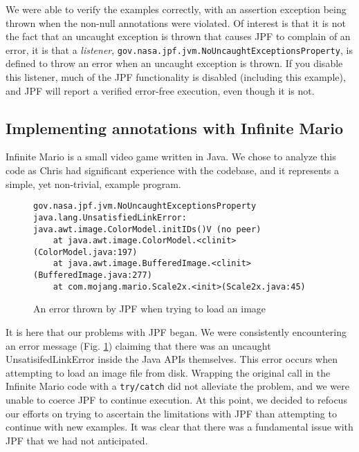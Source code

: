 \documentclass[twocolumn]{article}
\begin{document}
We were able to verify the examples correctly, with an assertion exception being thrown when the non-null annotations were violated. Of interest is that it is not the fact that an uncaught exception is thrown that causes JPF to complain of an error, it is that a \emph{listener}, \texttt{gov.nasa.jpf.jvm.NoUncaughtExceptionsProperty}, is defined to throw an error when an uncaught exception is thrown. If you disable this listener, much of the JPF functionality is disabled (including this example), and JPF will report a verified error-free execution, even though it is not.

\subsection{Implementing annotations with Infinite Mario}
Infinite Mario \cite{infinitemario} is a small video game written in Java. We chose to analyze this code as Chris had significant experience with the codebase, and it represents a simple, yet non-trivial, example program.

\begin{figure}[tb]
    \lstset{language=,breaklines=true}
    \begin{lstlisting}
gov.nasa.jpf.jvm.NoUncaughtExceptionsProperty
java.lang.UnsatisfiedLinkError: java.awt.image.ColorModel.initIDs()V (no peer)
    at java.awt.image.ColorModel.<clinit>(ColorModel.java:197)
	at java.awt.image.BufferedImage.<clinit>(BufferedImage.java:277)
    at com.mojang.mario.Scale2x.<init>(Scale2x.java:45)
\end{lstlisting}
	\caption{An error thrown by JPF when trying to load an image}
	    \label{listing:error}
	\end{figure}

It is here that our problems with JPF began. We were consistently encountering an error message (Fig. \ref{listing:error}) claiming that there was an uncaught UnsatisifedLinkError inside the Java APIs themselves. This error occurs when attempting to load an image file from disk. Wrapping the original call in the Infinite Mario code with a \texttt{try/catch} did not alleviate the problem, and we were unable to coerce JPF to continue execution. At this point, we decided to refocus our efforts on trying to ascertain the limitations with JPF than attempting to continue with new examples. It was clear that there was a fundamental issue with JPF that we had not anticipated. 
\end{document}
